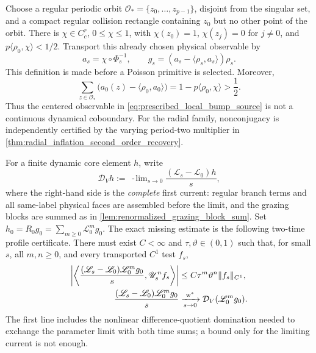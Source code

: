 \documentclass[11pt]{amsart}
\theoremstyle{compactplain}
\theoremstyle{compactdefinition}
\theoremstyle{compactremark}
\newcommand{\Ltransfer}{\mathscr L}
\begin{document}
Choose a regular periodic orbit
\(\mathcal O_*=\{z_0,\ldots,z_{p-1}\}\), disjoint from the singular set, and
a compact regular collision rectangle containing \(z_0\) but no other point
of the orbit.  There is \(\chi\in C_c^r\), \(0\le\chi\le1\), with
\(\chi(z_0)=1\), \(\chi(z_j)=0\) for \(j\ne0\), and
\(p\langle\rho_0,\chi\rangle<1/2\).  Transport this already chosen physical
observable by
\begin{equation}
\label{eq:prescribed_local_bump_source}
 a_s=\chi\circ\Phi_s^{-1},\qquad
 g_s=(a_s-\langle\rho_s,a_s\rangle)\rho_s.
\end{equation}
This definition is made before a Poisson primitive is selected.  Moreover,
\begin{equation}
\label{eq:prescribed_bump_periodic_certificate}
 \sum_{z\in\mathcal O_*}
 \bigl(a_0(z)-\langle\rho_0,a_0\rangle\bigr)
 =1-p\langle\rho_0,\chi\rangle>\frac12.
\end{equation}
Thus the centered observable in \eqref{eq:prescribed_local_bump_source} is not
a continuous dynamical coboundary.  For the radial family, nonconjugacy is
independently certified by the varying period-two multiplier in
\cref{thm:radial_inflation_second_order_recovery}.

For a finite dynamic core element \(h\), write
\begin{equation}
\label{eq:complete_first_defect_profile}
 \mathcal D_Vh
 :=\mathop{\mathrm{w}^*\!\!-\!\lim}_{s\to0}
 \frac{(\Ltransfer_s-\Ltransfer_0)h}{s},
\end{equation}
where the right-hand side is the \emph{complete} first current: regular
branch terms and all same-label physical faces are assembled before the
limit, and the grazing blocks are summed as in
\cref{lem:renormalized_grazing_block_sum}.  Set
\(h_0=R_0g_0=\sum_{m\ge0}\Ltransfer_0^mg_0\).  The exact missing estimate is
the following two-time profile certificate.  There must exist
\(C<\infty\) and \(\tau,\vartheta\in(0,1)\) such that, for small \(s\),
all \(m,n\ge0\), and every transported \(C^1\) test \(f_s\),
\begin{align}
\label{eq:two_time_conditional_mixing_certificate}
 \left|
 \left\langle
 \frac{(\Ltransfer_s-\Ltransfer_0)\Ltransfer_0^mg_0}{s},
 \mathscr U_s^nf_s
 \right\rangle\right|
 &\le C\tau^m\vartheta^n\|f_s\|_{C^1},\\
 \frac{(\Ltransfer_s-\Ltransfer_0)\Ltransfer_0^mg_0}{s}
 &\xrightarrow[s\to0]{\mathrm{w}^*}
 \mathcal D_V(\Ltransfer_0^mg_0).
\notag
\end{align}
The first line includes the nonlinear difference-quotient domination needed
to exchange the parameter limit with both time sums; a bound only for the
limiting current is not enough.
\end{document}
